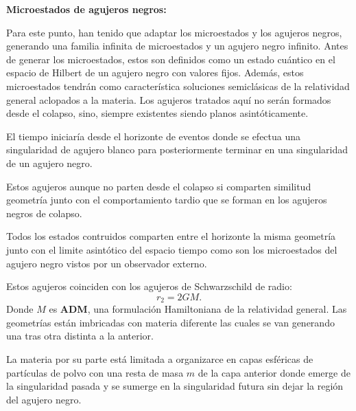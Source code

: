 \documentclass[letterpaper]{article}
\begin{document}
\begin{justify}
\textbf{Microestados de agujeros negros:}
\end{justify}
\begin{justify}
Para  este punto, han tenido que adaptar los microestados y los agujeros negros, generando una familia infinita de microestados y un agujero negro infinito.
Antes de generar los microestados, estos son definidos como un estado cuántico en el espacio de Hilbert de un agujero negro con valores fijos. Además, estos
microestados tendrán como característica soluciones semiclásicas de la relatividad general aclopados a la materia. Los agujeros tratados aquí no serán
formados desde el colapso, sino, siempre existentes siendo planos asintóticamente.
\end{justify}
\begin{justify}
El tiempo iniciaría desde el horizonte de eventos donde se efectua una singularidad de agujero blanco para posteriormente terminar en una singularidad de un agujero negro.
\end{justify}
\begin{justify}
Estos agujeros aunque no parten desde el colapso si comparten similitud geometría junto con el comportamiento tardio que se forman en los agujeros negros de colapso.
\end{justify}
\begin{justify}
Todos los estados contruidos comparten  entre el horizonte la misma geometría junto con el limite asintótico del espacio tiempo como son los microestados del agujero negro
vistos por un observador externo.
\end{justify}
\begin{justify}
Estos agujeros coinciden con los agujeros de Schwarzschild de radio: \[r_2=2GM.\] Donde \(M\) es \textbf{ADM}, una formulación Hamiltoniana de la relatividad general. Las geometrías
están imbricadas con materia diferente las cuales se van generando una tras otra distinta a la anterior.
\end{justify}
\begin{justify}
La materia por su parte está limitada a organizarce en capas esféricas de partículas de polvo con una resta de masa \(m\) de la capa anterior donde emerge de la singularidad pasada y se sumerge en la singularidad
futura sin dejar la región del agujero negro.
\end{justify}

\newpage
\end{document}
